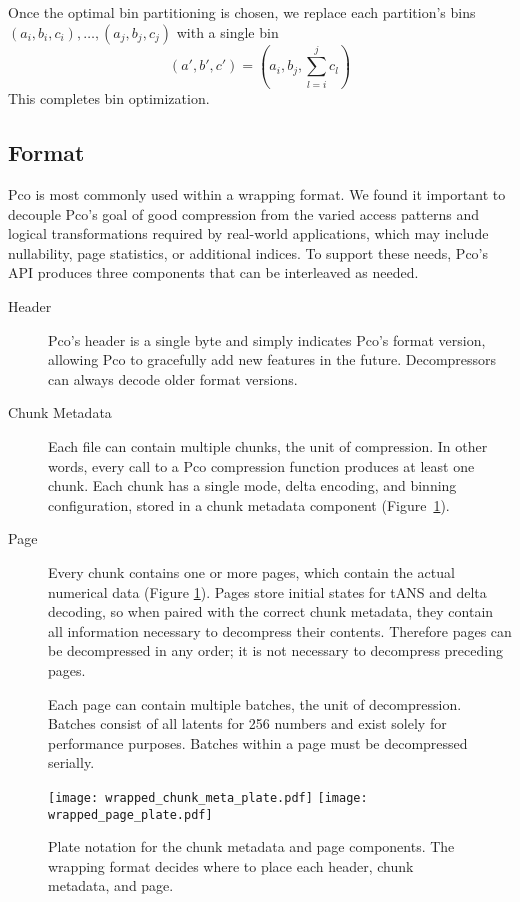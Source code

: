 \documentclass[letterpaper]{article}
\begin{document}
Once the optimal bin partitioning is chosen, we replace each partition's bins $(a_i, b_i, c_i), \ldots, (a_j, b_j, c_j)$ with a single bin
\[(a', b', c') = \left(a_i, b_j, \sum_{l=i}^j c_l\right)\]
This completes bin optimization.

\subsection{Format}

Pco is most commonly used within a wrapping format.
We found it important to decouple Pco's goal of good compression from the varied access patterns and logical transformations required by real-world applications, which may include nullability, page statistics, or additional indices.
To support these needs, Pco's API produces three components that can be interleaved as needed.

\begin{description}
    \item[Header]
    Pco's header is a single byte and simply indicates Pco's format version, allowing Pco to gracefully add new features in the future.
    Decompressors can always decode older format versions.
    
    \item[Chunk Metadata]
    Each file can contain multiple chunks, the unit of compression.
    In other words, every call to a Pco compression function produces at least one chunk.
    Each chunk has a single mode, delta encoding, and binning configuration, stored in a chunk metadata component (Figure~\ref{fig:format}).
    
    \item[Page]
    Every chunk contains one or more pages, which contain the actual numerical data (Figure \ref{fig:format}).
    Pages store initial states for tANS and delta decoding, so when paired with the correct chunk metadata, they contain all information necessary to decompress their contents.
    Therefore pages can be decompressed in any order; it is not necessary to decompress preceding pages.
    
    Each page can contain multiple batches, the unit of decompression.
    Batches consist of all latents for 256 numbers and exist solely for performance purposes.
    Batches within a page must be decompressed serially.
\end{description}

\begin{figure}
\begin{center}
\texttt{[image: wrapped\_chunk\_meta\_plate.pdf]}
\texttt{[image: wrapped\_page\_plate.pdf]}
\end{center}
\caption{
Plate notation for the chunk metadata and page components.
The wrapping format decides where to place each header, chunk metadata, and page.
}
\label{fig:format}
\end{figure}
\end{document}

